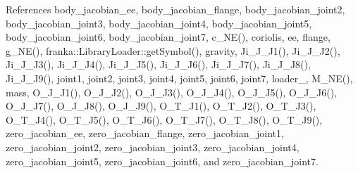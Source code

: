 References body\+\_\+jacobian\+\_\+ee, body\+\_\+jacobian\+\_\+flange, body\+\_\+jacobian\+\_\+joint2, body\+\_\+jacobian\+\_\+joint3, body\+\_\+jacobian\+\_\+joint4, body\+\_\+jacobian\+\_\+joint5, body\+\_\+jacobian\+\_\+joint6, body\+\_\+jacobian\+\_\+joint7, c\+\_\+\+N\+E(), coriolis, ee, flange, g\+\_\+\+N\+E(), franka\+::\+Library\+Loader\+::get\+Symbol(), gravity, Ji\+\_\+\+J\+\_\+\+J1(), Ji\+\_\+\+J\+\_\+\+J2(), Ji\+\_\+\+J\+\_\+\+J3(), Ji\+\_\+\+J\+\_\+\+J4(), Ji\+\_\+\+J\+\_\+\+J5(), Ji\+\_\+\+J\+\_\+\+J6(), Ji\+\_\+\+J\+\_\+\+J7(), Ji\+\_\+\+J\+\_\+\+J8(), Ji\+\_\+\+J\+\_\+\+J9(), joint1, joint2, joint3, joint4, joint5, joint6, joint7, loader\+\_\+, M\+\_\+\+N\+E(), mass, O\+\_\+\+J\+\_\+\+J1(), O\+\_\+\+J\+\_\+\+J2(), O\+\_\+\+J\+\_\+\+J3(), O\+\_\+\+J\+\_\+\+J4(), O\+\_\+\+J\+\_\+\+J5(), O\+\_\+\+J\+\_\+\+J6(), O\+\_\+\+J\+\_\+\+J7(), O\+\_\+\+J\+\_\+\+J8(), O\+\_\+\+J\+\_\+\+J9(), O\+\_\+\+T\+\_\+\+J1(), O\+\_\+\+T\+\_\+\+J2(), O\+\_\+\+T\+\_\+\+J3(), O\+\_\+\+T\+\_\+\+J4(), O\+\_\+\+T\+\_\+\+J5(), O\+\_\+\+T\+\_\+\+J6(), O\+\_\+\+T\+\_\+\+J7(), O\+\_\+\+T\+\_\+\+J8(), O\+\_\+\+T\+\_\+\+J9(), zero\+\_\+jacobian\+\_\+ee, zero\+\_\+jacobian\+\_\+flange, zero\+\_\+jacobian\+\_\+joint1, zero\+\_\+jacobian\+\_\+joint2, zero\+\_\+jacobian\+\_\+joint3, zero\+\_\+jacobian\+\_\+joint4, zero\+\_\+jacobian\+\_\+joint5, zero\+\_\+jacobian\+\_\+joint6, and zero\+\_\+jacobian\+\_\+joint7.


